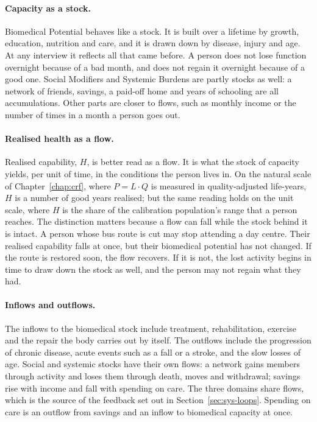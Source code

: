 \paragraph{Capacity as a stock.} Biomedical Potential behaves like a stock. It
is built over a lifetime by growth, education, nutrition and care, and it is
drawn down by disease, injury and age. At any interview it reflects all that
came before. A person does not lose function overnight because of a bad
month, and does not regain it overnight because of a good one. Social
Modifiers and Systemic Burdens are partly stocks as well: a network of
friends, savings, a paid-off home and years of schooling are all
accumulations. Other parts are closer to flows, such as monthly income or the
number of times in a month a person goes out.

\paragraph{Realised health as a flow.} Realised capability, $H$, is better
read as a flow. It is what the stock of capacity yields, per unit of time, in
the conditions the person lives in. On the natural scale of
Chapter~\ref{chap:crf}, where $P=L\cdot Q$ is measured in quality-adjusted
life-years, $H$ is a number of good years realised; but the same reading holds
on the unit scale, where $H$ is the share of the calibration population's
range that a person reaches. The distinction matters because a flow can fall
while the stock behind it is intact. A person whose bus route is cut may stop
attending a day centre. Their realised capability falls at once, but their
biomedical potential has not changed. If the route is restored soon, the flow
recovers. If it is not, the lost activity begins in time to draw down the
stock as well, and the person may not regain what they had.

\paragraph{Inflows and outflows.} The inflows to the biomedical stock include
treatment, rehabilitation, exercise and the repair the body carries out by
itself. The outflows include the progression of chronic disease, acute events
such as a fall or a stroke, and the slow losses of age. Social and systemic
stocks have their own flows: a network gains members through activity and
loses them through death, moves and withdrawal; savings rise with income and
fall with spending on care. The three domains share flows, which is the source
of the feedback set out in Section~\ref{sec:sys-loops}. Spending on care is an
outflow from savings and an inflow to biomedical capacity at once.

